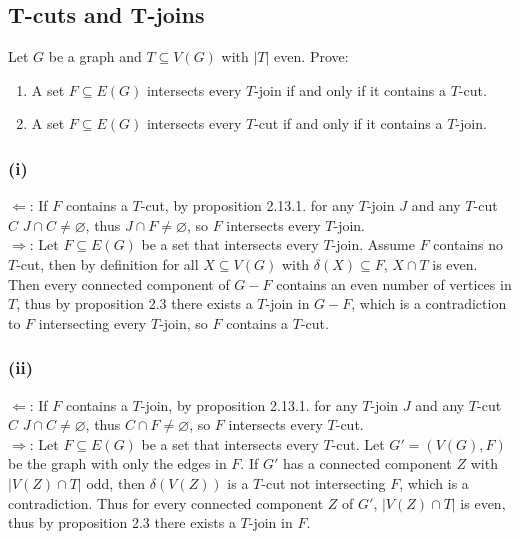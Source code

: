 \documentclass{article}
\let\emptyset\varnothing
\begin{document}
  \subsection{T-cuts and T-joins}
  \begin{centerframebox}
    Let $G$ be a graph and $T \subseteq V (G)$ with $|T|$ even. Prove:
    \begin{enumerate}[label=(\roman*)]
      \item A set $F \subseteq E(G)$ intersects every $T$-join if and only if it contains a $T$-cut.
      \item A set $F \subseteq E(G)$ intersects every $T$-cut if and only if it contains a $T$-join.
    \end{enumerate}
  \end{centerframebox}
  \subsubsection*{(i)}
  $\Leftarrow$: If $F$ contains a $T$-cut, by proposition 2.13.1. for any $T$-join $J$ and any $T$-cut $C$ $J\cap C\neq\emptyset$, thus $J\cap F\neq \emptyset$, so $F$ intersects every $T$-join.\\
  $\Rightarrow$: Let  $F \subseteq E(G)$ be a set that intersects every $T$-join. Assume $F$ contains no $T$-cut, then by definition for all $X\subseteq V(G)$ with $\delta(X)\subseteq F$, $X\cap T$ is even. Then every connected component of $G-F$ contains an even number of vertices in $T$, thus by proposition 2.3 there exists a $T$-join in $G-F$, which is a contradiction to $F$ intersecting every $T$-join, so $F$ contains a $T$-cut.

  \subsubsection*{(ii)}
  $\Leftarrow$: If $F$ contains a $T$-join, by proposition 2.13.1. for any $T$-join $J$ and any $T$-cut $C$ $J\cap C\neq\emptyset$, thus $C\cap F\neq \emptyset$, so $F$ intersects every $T$-cut.\\
  $\Rightarrow$: Let $F \subseteq E(G)$  be a set that intersects every $T$-cut. Let $G'=(V(G),F)$ be the graph with only the edges in $F$. If $G'$ has a connected component $Z$ with $|V(Z)\cap T|$ odd, then $\delta(V(Z))$ is a $T$-cut not intersecting $F$, which is a contradiction. Thus for every connected component $Z$ of $G'$, $|V(Z)\cap T|$ is even, thus by proposition 2.3 there exists a $T$-join in $F$.
\end{document}
